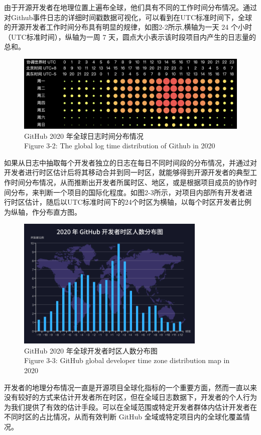 \par 由于开源开发者在地理位置上遍布全球，他们具有不同的工作时间分布情况。通过对Github事件日志的详细时间戳数据可视化，可以看到在UTC标准时间下，全球的开源开发者工作时间分布具有明显的规律，如图2-2所示,横轴为一天 24 个小时（UTC标准时间），纵轴为一周 7 天，圆点大小表示该时段项目内产生的日志量的总和。
\begin{figure}[H]
    \centering
    \includegraphics[width=130mm]{./figures/image2-2.png}
    \caption{GitHub 2020 年全球日志时间分布情况\\Figure 3-2: The global log time distribution of Github in 2020}
\end{figure}

\par 如果从日志中抽取每个开发者独立的日志在每日不同时间段的分布情况，并通过对开发者进行时区估计后将其移动合并到同一时区，就能够得到开源开发者的典型工作时间分布情况，从而推断出开发者所属时区、地区，或是根据项目成员的协作时间分布，来判断一个项目的国际化程度。如图2-3所示，对项目内部所有开发者进行时区估计，随后以UTC标准时间下的24个时区为横轴，以每个时区开发者比例为纵轴，作分布直方图。
\begin{figure}[H]
    \centering
    \includegraphics[width=90mm]{./figures/时区分布.png}
    \caption{GitHub 2020 年全球开发者时区人数分布图\\Figure 3-3: GitHub global developer time zone distribution map in 2020}
\end{figure}

\par 开发者的地理分布情况一直是开源项目全球化指标的一个重要方面，然而一直以来没有较好的方式来估计开发者所在时区，但在全域日志数据下，开发者的个人行为为我们提供了有效的估计手段。可以在全域范围或特定开发者群体内估计开发者在不同时区的占比情况，从而有效判断 GitHub 全域或特定项目内的全球化覆盖情况。

